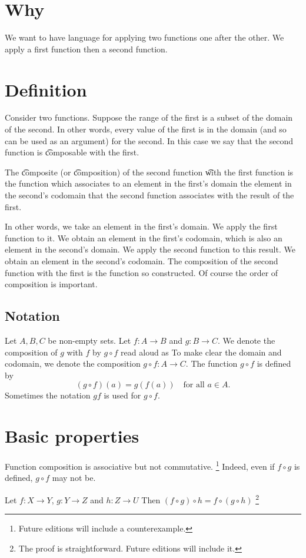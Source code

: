 
\section*{Why}

We want to have language for applying two functions one after the other.
We apply a first function then a second function.

\section*{Definition}

Consider two functions.
Suppose the range of the first is a subset of the domain of the second.
In other words, every value of the first is in the domain (and so can be used as an argument) for the second.
In this case we say that the second function is \t{composable} with the first.

The \t{composite} (or \t{composition}) of the second function \t{with} the first function is the function which associates to an element in the first's domain the element in the second's codomain that the second function associates with the result of the first.

In other words, we take an element in the first's domain.
We apply the first function to it.
We obtain an element in the first's codomain, which is also an element in the second's domain.
We apply the second function to this result.
We obtain an element in the second's codomain.
The composition of the second function with the first is the function so constructed.
Of course the order of composition is important.

\subsection*{Notation}

Let $A, B, C$ be non-empty sets.
Let $f: A \to B$ and $g: B \to C$.
We denote the composition of $g$ with $f$ by $g \circ f$ read aloud as 
To make clear the domain and codomain, we denote the composition $g \circ f: A \to C$.
The function $g \circ f$ is defined by
    \[
(g \circ f)(a) = g(f(a)) \quad \text{for all } a \in A.
    \]
Sometimes the notation $gf$ is used for $g \circ f$.

\section*{Basic properties}

Function composition is associative but not commutative.
    \ifhmode\unskip\fi\footnote{
Future editions will include a counterexample.
    }
Indeed, even if $f \circ g$ is defined, $g \circ f$ may not be.

\begin{proposition}[Associative]
Let $f: X \to Y$, $g: Y \to Z$ and $h: Z \to U$
Then $(f \circ g) \circ h = f \circ (g \circ h)$
  \ifhmode\unskip\fi\footnote{
The proof is straightforward. Future editions will include it.
  }\end{proposition}